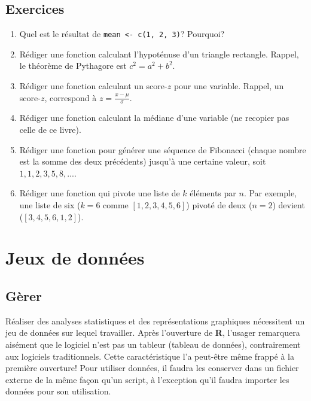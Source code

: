 \documentclass[
]{book}
\providecommand{\tightlist}{%
  \setlength{\itemsep}{0pt}\setlength{\parskip}{0pt}}
\begin{document}
\hypertarget{exercice-rudiments}{%
\chapter*{Exercices}\label{exercice-rudiments}}

\begin{enumerate}
\def\labelenumi{\arabic{enumi}.}
\tightlist
\item
  Quel est le résultat de \texttt{mean\ \textless{}-\ c(1,\ 2,\ 3)}? Pourquoi?
\item
  Rédiger une fonction calculant l'hypoténuse d'un triangle rectangle. Rappel, le théorème de Pythagore est \(c^2=a^2+b^2\).
\item
  Rédiger une fonction calculant un score-\(z\) pour une variable. Rappel, un score-\(z\), correspond à \(z=\frac{x-\mu}{\sigma}\).
\item
  Rédiger une fonction calculant la médiane d'une variable (ne recopier pas celle de ce livre).
\item
  Rédiger une fonction pour générer une séquence de Fibonacci (chaque nombre est la somme des deux précédents) jusqu'à une certaine valeur, soit \(1,1,2,3,5,8,...\).
\item
  Rédiger une fonction qui pivote une liste de \(k\) éléments par \(n\). Par exemple, une liste de six (\(k=6\) comme \([1,2,3,4,5,6]\)) pivoté de deux (\(n=2\)) devient (\([3,4,5,6,1,2]\)).
\end{enumerate}

\hypertarget{part-jeux-de-donnuxe9es}{%
\part{Jeux de données}\label{part-jeux-de-donnuxe9es}}

\hypertarget{guxe8rer}{%
\chapter{Gèrer}\label{guxe8rer}}

Réaliser des analyses statistiques et des représentations graphiques nécessitent un jeu de données sur lequel travailler. Après l'ouverture de \textbf{R}, l'usager remarquera aisément que le logiciel n'est pas un tableur (tableau de données), contrairement aux logiciels traditionnels. Cette caractéristique l'a peut-être même frappé à la première ouverture! Pour utiliser données, il faudra les conserver dans un fichier externe de la même façon qu'un script, à l'exception qu'il faudra importer les données pour son utilisation.
\end{document}
